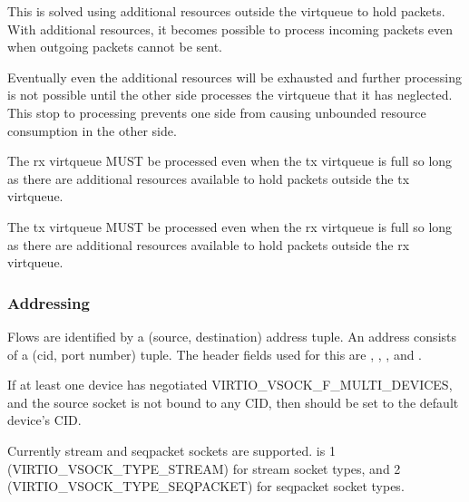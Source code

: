 This is solved using additional resources outside the virtqueue to hold
packets.  With additional resources, it becomes possible to process incoming
packets even when outgoing packets cannot be sent.

Eventually even the additional resources will be exhausted and further
processing is not possible until the other side processes the virtqueue that
it has neglected.  This stop to processing prevents one side from causing
unbounded resource consumption in the other side.


The rx virtqueue MUST be processed even when the tx virtqueue is full so long as there are additional resources available to hold packets outside the tx virtqueue.


The tx virtqueue MUST be processed even when the rx virtqueue is full so long as there are additional resources available to hold packets outside the rx virtqueue.

\subsubsection{Addressing}\label{sec:Device Types / Socket Device / Device Operation / Addressing}

Flows are identified by a (source, destination) address tuple.  An address
consists of a (cid, port number) tuple. The header fields used for this are
, , , and .

If at least one device has negotiated VIRTIO_VSOCK_F_MULTI_DEVICES, and the
source socket is not bound to any CID, then  should be set
to the default device's CID.

Currently stream and seqpacket sockets are supported.  is 1 (VIRTIO_VSOCK_TYPE_STREAM)
for stream socket types, and 2 (VIRTIO_VSOCK_TYPE_SEQPACKET) for seqpacket socket types.

